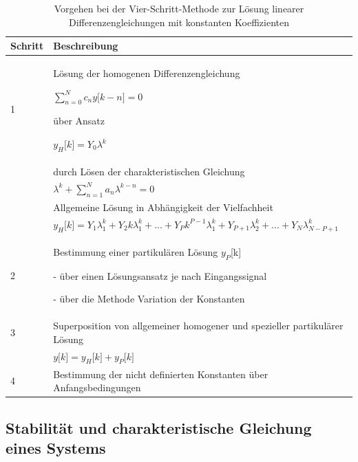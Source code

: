 \begin{table}
  \centering
  \caption{Vorgehen bei der Vier-Schritt-Methode zur Lösung linearer Differenzengleichungen mit konstanten Koeffizienten}
  \label{tab:4.3}
  \begin{tabular}{ll}
    \toprule
    Schritt & Beschreibung \\
    \midrule
    1 & Lösung der homogenen Differenzengleichung

\(\sum\limits_{n = 0}^{N}{c_{n}  y\lbrack k - n\rbrack} = 0\)

über Ansatz

\(y_{H}\lbrack k\rbrack = Y_{0}  \lambda^{k}\) \\
    & durch Lösen der charakteristischen Gleichung \\
    & \(\lambda^{k} + \sum\limits_{n = 1}^{N}{a_{n}  \lambda^{k - n}} = 0\) \\
    & Allgemeine Lösung in Abhängigkeit der Vielfachheit \\
    & \(y_{H}\lbrack k\rbrack = Y_{1}  \lambda_{1}^{k} + Y_{2}  k  \lambda_{1}^{k} + ... + Y_{P}  k^{P - 1}  \lambda_{1}^{k} + Y_{P + 1}  \lambda_{2}^{k} + ... + Y_{N}  \lambda_{N - P + 1}^{k}\) \\
    2 & Bestimmung einer partikulären Lösung \(y_{P}\){[}k{]}

- über einen Lösungsansatz je nach Eingangssignal

- über die Methode Variation der Konstanten \\
    3 & Superposition von allgemeiner homogener und spezieller partikulärer Lösung \\
    & \(y\lbrack k\rbrack = y_{H}\lbrack k\rbrack + y_{P}\lbrack k\rbrack\) \\
    4 & Bestimmung der nicht definierten Konstanten über Anfangsbedingungen \\
    \bottomrule
  \end{tabular}
\end{table}

\subsection{Stabilität und charakteristische Gleichung eines Systems}\label{sec:4.3.3}

